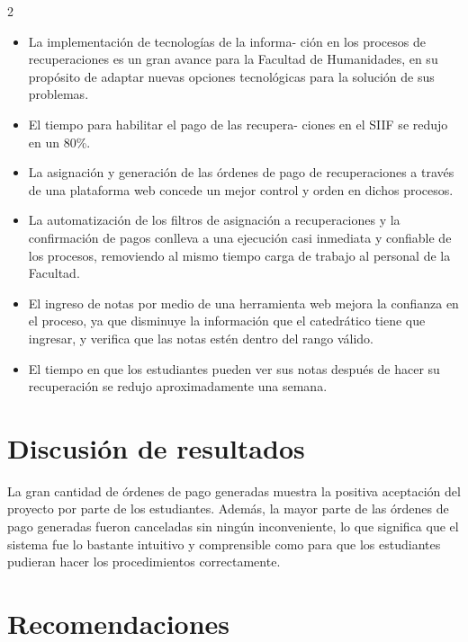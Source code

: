 \documentclass[12pt,spanish,Letterpaper,openany]{book}
\newcommand{\spaceoneminus}{\vspace{-1mm}}
\newcommand{\spacetwominus}{\vspace{-2mm}}
\newcommand{\spacefourminus}{\vspace{-4mm}}
\begin{document}
\begin {multicols}{2}
\begin{itemize}
\item
  La implementación de tecnologías de la informa-
  ción en los procesos de recuperaciones es un gran avance para la Facultad de Humanidades, en su propósito de adaptar nuevas opciones tecnológicas para la solución de sus problemas.
\item
  El tiempo para habilitar el pago de las recupera-
  ciones en el SIIF se redujo en un 80\%.
\item
  La asignación y generación de las órdenes de pago de recuperaciones a través de una plataforma web concede un mejor control y orden en dichos procesos.
\item
  La automatización de los filtros de asignación a recuperaciones y la confirmación de pagos conlleva a una ejecución casi inmediata y confiable de los procesos, removiendo al mismo tiempo carga de trabajo al personal de la Facultad.
\item
  El ingreso de notas por medio de una herramienta web mejora la confianza en el proceso, ya que disminuye la información que el catedrático tiene que ingresar, y verifica que las notas estén dentro del rango válido.
\item
  El tiempo en que los estudiantes pueden ver sus notas después de hacer su recuperación se redujo aproximadamente una semana.
\end{itemize}

\hypertarget{discusion-de-resultados}{%
\section{Discusión de resultados}\label{discusion-de-resultados}}

\spaceoneminus
\spacetwominus

La gran cantidad de órdenes de pago generadas muestra la positiva aceptación del proyecto por parte de los estudiantes. Además, la mayor parte de las órdenes de pago generadas fueron canceladas sin ningún inconveniente, lo que significa que el sistema fue lo bastante intuitivo y comprensible como para que los estudiantes pudieran hacer los procedimientos correctamente.

\spacefourminus
\spacetwominus

\hypertarget{recomendaciones-1}{%
\section{Recomendaciones}\label{recomendaciones-1}}


\end{multicols}
\end{document}
